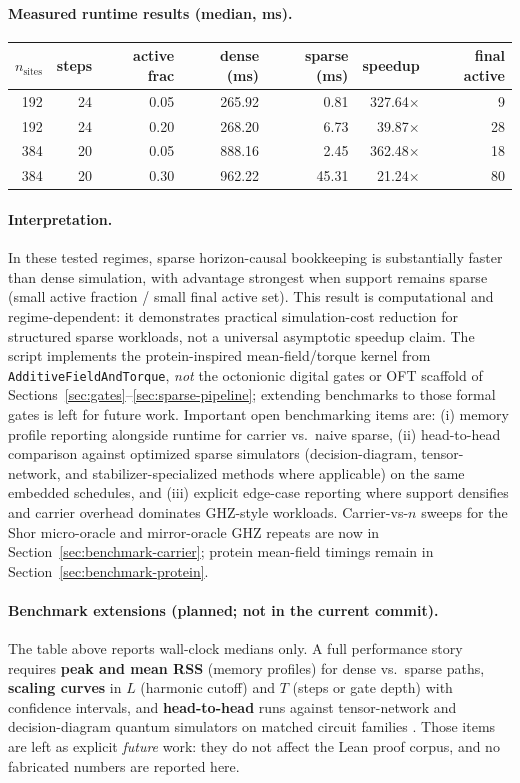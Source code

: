 \documentclass[11pt,a4paper]{article}
\theoremstyle{remark}
\begin{document}
\paragraph{Measured runtime results (median, ms).}
\begin{center}
\begin{tabular}{|r|r|r|r|r|r|r|}
\hline
$n_{\text{sites}}$ & steps & active frac & dense (ms) & sparse (ms) & speedup & final active \\
\hline
192 & 24 & 0.05 & 265.92 & 0.81 & 327.64$\times$ & 9 \\
192 & 24 & 0.20 & 268.20 & 6.73 & 39.87$\times$ & 28 \\
384 & 20 & 0.05 & 888.16 & 2.45 & 362.48$\times$ & 18 \\
384 & 20 & 0.30 & 962.22 & 45.31 & 21.24$\times$ & 80 \\
\hline
\end{tabular}
\end{center}

\paragraph{Interpretation.}
In these tested regimes, sparse horizon-causal bookkeeping is substantially faster than dense simulation, with advantage strongest when support remains sparse (small active fraction / small final active set). This result is computational and regime-dependent: it demonstrates practical simulation-cost reduction for structured sparse workloads, not a universal asymptotic speedup claim. The script implements the protein-inspired mean-field/torque kernel from \texttt{AdditiveFieldAndTorque}, \emph{not} the octonionic digital gates or OFT scaffold of Sections~\ref{sec:gates}--\ref{sec:sparse-pipeline}; extending benchmarks to those formal gates is left for future work.
Important open benchmarking items are: (i) memory profile reporting alongside runtime for carrier vs.\ naive sparse, (ii) head-to-head comparison against optimized sparse simulators (decision-diagram, tensor-network, and stabilizer-specialized methods where applicable) on the same embedded schedules, and (iii) explicit edge-case reporting where support densifies and carrier overhead dominates GHZ-style workloads.
Carrier-vs-$n$ sweeps for the Shor micro-oracle and mirror-oracle GHZ repeats are now in Section~\ref{sec:benchmark-carrier}; protein mean-field timings remain in Section~\ref{sec:benchmark-protein}.

\paragraph{Benchmark extensions (planned; not in the current commit).}
The table above reports wall-clock medians only. A full performance story requires \textbf{peak and mean RSS} (memory profiles) for dense vs.\ sparse paths, \textbf{scaling curves} in $L$ (harmonic cutoff) and $T$ (steps or gate depth) with confidence intervals, and \textbf{head-to-head} runs against tensor-network and decision-diagram quantum simulators on matched circuit families \cite{sparsesim2024,sun2025}. Those items are left as explicit \emph{future} work: they do not affect the Lean proof corpus, and no fabricated numbers are reported here.
\end{document}
